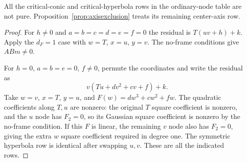 \begin{corollary}\label{cor:ordinaryconics}
All the critical-conic and critical-hyperbola rows in the ordinary-node
table are not pure. Proposition~\ref{prop:axisexclusion} treats its remaining center-axis row.
\end{corollary}
\begin{proof}
For $h\ne0$ and $a=b=c=d=e=f=0$ the residual is
$T(uv+h)+k$. Apply the $d_F=1$ case with $w=T$, $x=u$, $y=v$.
The no-frame conditions give $ABm\ne0$.

For $h=0$, $a=b=e=0$, $f\ne0$, permute the coordinates and
write the residual as
\[
 v(Tu+d v^2+c v+f)+k.
\]
Take $w=v$, $x=T$, $y=u$, and
$F(w)=d w^3+c w^2+f w$. The quadratic coefficients along $T,u$
are nonzero: the original $T$ square coefficient is nonzero, and the $u$
node has $F_2=0$, so its Gaussian square coefficient is nonzero
by the no-frame condition. If this $F$ is linear, the remaining
$v$ node also has $F_2=0$, giving the extra $w$ square coefficient
required in degree one. The symmetric hyperbola row is identical
after swapping $u,v$. These are all the indicated rows.
\end{proof}
